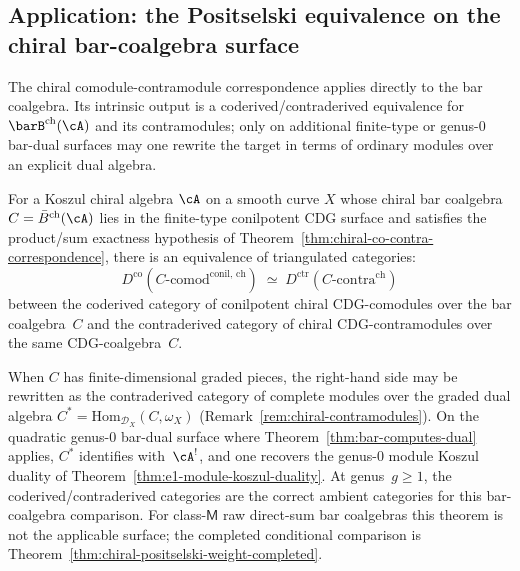 \subsection{Application: the Positselski equivalence on the chiral bar-coalgebra surface}
\label{subsec:positselski-chiral-equivalence}

The chiral comodule-contramodule correspondence applies directly to the
bar coalgebra. Its intrinsic output is a coderived/contraderived
equivalence for $\barB^{\mathrm{ch}}(\cA)$ and its contramodules; only
on additional finite-type or genus-$0$ bar-dual surfaces may one
rewrite the target in terms of ordinary modules over an explicit dual
algebra.

\begin{theorem}
\label{thm:positselski-chiral-finite-type}
For a Koszul chiral algebra $\cA$ on a smooth curve $X$ whose
chiral bar coalgebra $C = \bar{B}^{\mathrm{ch}}(\cA)$ lies in the
finite-type conilpotent CDG surface and satisfies the product/sum
exactness hypothesis of
Theorem~\textup{\ref{thm:chiral-co-contra-correspondence}}, there is
an equivalence of
triangulated categories:
\begin{equation}\label{eq:positselski-chiral-finite-type}
D^{\mathrm{co}}(C\text{-}\mathrm{comod}^{\mathrm{conil,\,ch}})
\;\simeq\;
D^{\mathrm{ctr}}(C\text{-}\mathrm{contra}^{\mathrm{ch}})
\end{equation}
between the coderived category of conilpotent chiral
CDG-comodules over the bar coalgebra~$C$ and the contraderived
category of chiral CDG-contramodules over the same
CDG-coalgebra~$C$.

When $C$ has finite-dimensional graded pieces, the right-hand side may
be rewritten as the contraderived category of complete modules over the
graded dual algebra
$C^*=\mathrm{Hom}_{\mathcal{D}_X}(C,\omega_X)$
\textup{(}Remark~\textup{\ref{rem:chiral-contramodules}}\textup{)}.
On the quadratic genus-$0$ bar-dual surface where
Theorem~\textup{\ref{thm:bar-computes-dual}} applies, $C^*$ identifies
with~$\cA^!$, and one recovers the genus-$0$ module Koszul duality of
Theorem~\textup{\ref{thm:e1-module-koszul-duality}}.
At genus~$g \geq 1$, the coderived/contraderived categories are the
correct ambient categories for this bar-coalgebra comparison.
For class-$\mathsf M$ raw direct-sum bar coalgebras this theorem is
not the applicable surface; the completed conditional comparison is
Theorem~\textup{\ref{thm:chiral-positselski-weight-completed}}.
\end{theorem}

